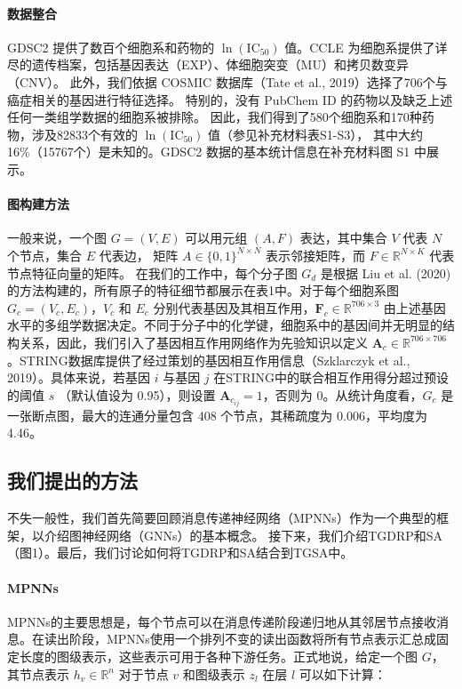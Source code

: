 \paragraph{数据整合}
GDSC2 提供了数百个细胞系和药物的 $\ln(\text{IC}_{50})$ 值。CCLE 为细胞系提供了详尽的遗传档案，包括基因表达（EXP）、体细胞突变（MU）和拷贝数变异（CNV）。
此外，我们依据 COSMIC 数据库（Tate et al., 2019）选择了706个与癌症相关的基因进行特征选择。
特别的，没有 PubChem ID 的药物以及缺乏上述任何一类组学数据的细胞系被排除。
因此，我们得到了580个细胞系和170种药物，涉及82833个有效的 $\ln(\text{IC}_{50})$ 值（参见补充材料表S1-S3），
其中大约16\%（15767个）是未知的。GDSC2 数据的基本统计信息在补充材料图 S1 中展示。

\paragraph{图构建方法}
一般来说，一个图 $G = (V, E)$ 可以用元组 $(A, F)$ 表达，其中集合 $V$ 代表 $N$ 个节点，集合 $E$ 代表边，
矩阵 $A \in \{0, 1\}^{N \times N}$ 表示邻接矩阵，而 $F \in \mathbb{R}^{N \times K}$ 代表节点特征向量的矩阵。
在我们的工作中，每个分子图 $G_d$ 是根据 Liu et al. (2020) 的方法构建的，所有原子的特征细节都展示在表1中。对于每个细胞系图 $G_c = (V_c, E_c)$，$V_c$ 和 $E_c$ 分别代表基因及其相互作用，$\mathbf{F}_c \in \mathbb{R}^{706 \times 3}$ 由上述基因水平的多组学数据决定。不同于分子中的化学键，细胞系中的基因间并无明显的结构关系，因此，我们引入了基因相互作用网络作为先验知识以定义 $\mathbf{A}_c \in \mathbb{R}^{706 \times 706}$。STRING数据库提供了经过策划的基因相互作用信息（Szklarczyk et al., 2019）。具体来说，若基因 $i$ 与基因 $j$ 在STRING中的联合相互作用得分超过预设的阈值 $s$ （默认值设为 0.95），则设置 $\mathbf{A}_{c_{ij}} = 1$，否则为 0。从统计角度看，$G_c$ 是一张断点图，最大的连通分量包含 408 个节点，其稀疏度为 0.006，平均度为 4.46。

\subsection{我们提出的方法}
不失一般性，我们首先简要回顾消息传递神经网络（MPNNs）\cite{Gilmer2017}作为一个典型的框架，以介绍图神经网络（GNNs）的基本概念。
接下来，我们介绍TGDRP和SA（图1）。最后，我们讨论如何将TGDRP和SA结合到TGSA中。

\paragraph{MPNNs}
MPNNs的主要思想是，每个节点可以在消息传递阶段递归地从其邻居节点接收消息。在读出阶段，MPNNs使用一个排列不变的读出函数将所有节点表示汇总成固定长度的图级表示，这些表示可用于各种下游任务。正式地说，给定一个图 $G$，其节点表示 $h_v \in \mathbb{R}^n$ 对于节点 $v$ 和图级表示 $z_l$ 在层 $l$ 可以如下计算：

